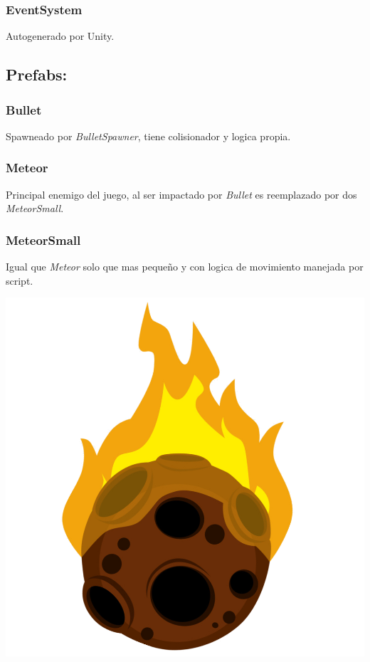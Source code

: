 \documentclass[journal]{IEEEtran}
\newenvironment{Figure}
  {\par\medskip\noindent\minipage{\linewidth}}
  {\endminipage\par\medskip}
\begin{document}
\medskip
\subsubsection*{EventSystem}
Autogenerado por Unity.

\subsection*{Prefabs:}

\subsubsection*{Bullet}
Spawneado por \textit{BulletSpawner}, tiene colisionador y logica propia.

\begin{multicols}{2}
  \subsubsection*{Meteor}
  Principal enemigo del juego, al ser impactado por \textit{Bullet} es
  reemplazado por dos \textit{MeteorSmall}.

  \medskip

  \subsubsection*{MeteorSmall}
  Igual que \textit{Meteor} solo que mas pequeño y con logica de movimiento
  manejada por script.

  \vfill\null
  \columnbreak

  \null\vfill
  \begin{Figure}
    \centering
    \includegraphics[width=0.4\linewidth]{../Assets/Sprites/Meteor.png}
    \label{fig:MeteorSprite}
  \end{Figure}
  \vfill\null
\end{multicols}

\break
\end{document}
